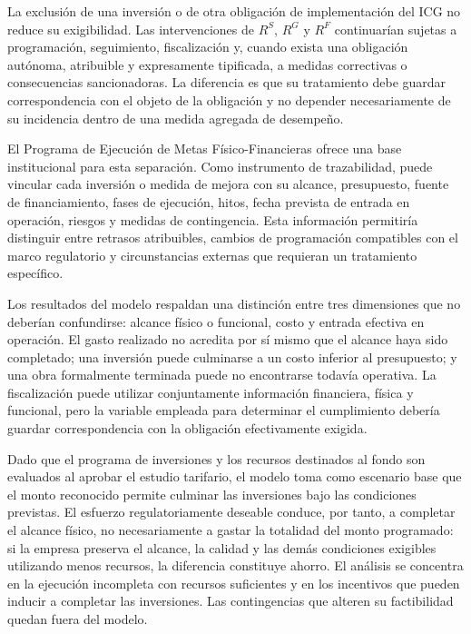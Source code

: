 La exclusión de una inversión o de otra obligación de implementación del ICG no reduce su exigibilidad. Las intervenciones de \(R^{S}\), \(R^{G}\) y \(R^{F}\) continuarían sujetas a programación, seguimiento, fiscalización y, cuando exista una obligación autónoma, atribuible y expresamente tipificada, a medidas correctivas o consecuencias sancionadoras. La diferencia es que su tratamiento debe guardar correspondencia con el objeto de la obligación y no depender necesariamente de su incidencia dentro de una medida agregada de desempeño.

El Programa de Ejecución de Metas Físico-Financieras ofrece una base institucional para esta separación. Como instrumento de trazabilidad, puede vincular cada inversión o medida de mejora con su alcance, presupuesto, fuente de financiamiento, fases de ejecución, hitos, fecha prevista de entrada en operación, riesgos y medidas de contingencia. Esta información permitiría distinguir entre retrasos atribuibles, cambios de programación compatibles con el marco regulatorio y circunstancias externas que requieran un tratamiento específico.

Los resultados del modelo respaldan una distinción entre tres dimensiones que no deberían confundirse: alcance físico o funcional, costo y entrada efectiva en operación. El gasto realizado no acredita por sí mismo que el alcance haya sido completado; una inversión puede culminarse a un costo inferior al presupuesto; y una obra formalmente terminada puede no encontrarse todavía operativa. La fiscalización puede utilizar conjuntamente información financiera, física y funcional, pero la variable empleada para determinar el cumplimiento debería guardar correspondencia con la obligación efectivamente exigida.

Dado que el programa de inversiones y los recursos destinados al fondo son evaluados al aprobar el estudio tarifario, el modelo toma como escenario base que el monto reconocido permite culminar las inversiones bajo las condiciones previstas. El esfuerzo regulatoriamente deseable conduce, por tanto, a completar el alcance físico, no necesariamente a gastar la totalidad del monto programado: si la empresa preserva el alcance, la calidad y las demás condiciones exigibles utilizando menos recursos, la diferencia constituye ahorro. El análisis se concentra en la ejecución incompleta con recursos suficientes y en los incentivos que pueden inducir a completar las inversiones. Las contingencias que alteren su factibilidad quedan fuera del modelo.

